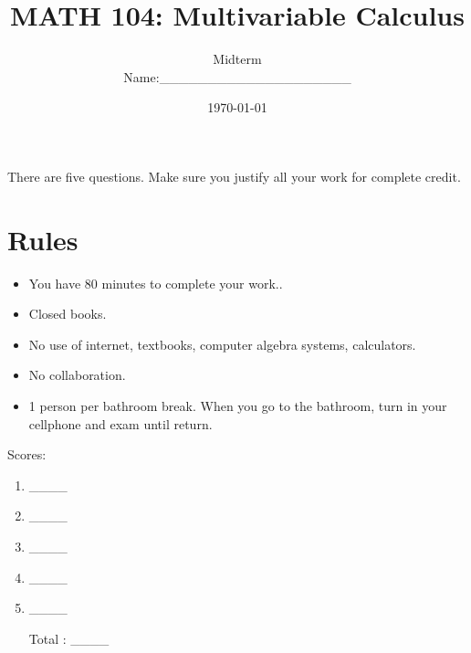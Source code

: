 \documentclass[12pt]{amsart}
\title{ MATH 104: Multivariable Calculus }
\author{Midterm \\ Name:\_\_\_\_\_\_\_\_\_\_\_\_\_\_\_\_\_\_\_\_}
\date{\today}
\begin{document}
\maketitle

There are five questions. Make sure you justify all your work for complete credit.

\section*{Rules}

\begin{itemize}[leftmargin=*]
    \item You have 80  minutes to complete your work..
    \item Closed books.
    \item No use of internet, textbooks, computer algebra systems, calculators. 
    \item No collaboration.
    \item 1 person per bathroom break. When you go to the bathroom, turn in your cellphone and exam until return.
\end{itemize}


Scores:
\begin{enumerate}
    \item \_\_\_\_
    \item \_\_\_\_
    \item \_\_\_\_
    \item \_\_\_\_
    \item \_\_\_\_
    \item[Total]: \_\_\_\_
\end{enumerate}

\newpage
\end{document}

